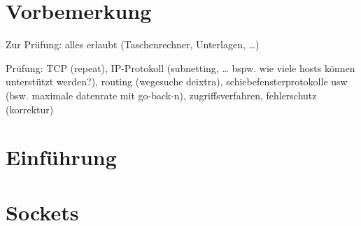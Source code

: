 \newcommand{\customDir}{../}








%
\setlength{\headheight}{10mm}	%



\maketitle
\newpage
\tableofcontents
\newpage

\chapter*{Vorbemerkung}

Zur Prüfung: alles erlaubt (Taschenrechner, Unterlagen, …)

Prüfung: TCP (repeat), IP-Protokoll (subnetting, … bspw. wie viele hosts können unterstützt werden?), routing (wegesuche deixtra), schiebefensterprotokolle usw (bsw. maximale datenrate mit go-back-n), zugriffsverfahren, fehlerschutz (korrektur)

\chapter{Einführung}


\chapter{Sockets}


